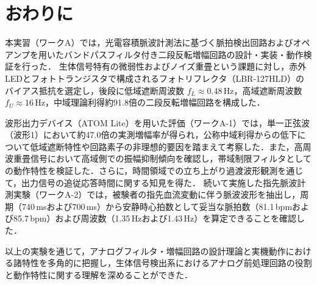 \section{おわりに}

本実習（ワークA）では，光電容積脈波計測法に基づく脈拍検出回路およびオペアンプを用いたバンドパスフィルタ付き二段反転増幅回路の設計・実装・動作検証を行った．
生体信号特有の微弱性およびノイズ重畳という課題に対し，赤外LEDとフォトトランジスタで構成されるフォトリフレクタ（LBR-127HLD）のバイアス抵抗を選定し，後段に低域遮断周波数 $f_L \approx 0.48\,\mathrm{Hz}$，高域遮断周波数 $f_U \approx 16\,\mathrm{Hz}$，中域理論利得約91.8倍の二段反転増幅回路を構成した．

波形出力デバイス（ATOM Lite）を用いた評価（ワークA-1）では，単一正弦波（波形1）において約47.0倍の実測増幅率が得られ，公称中域利得からの低下について低域遮断特性や回路素子の非理想的要因を踏まえて考察した．また，高周波重畳信号において高域側での振幅抑制傾向を確認し，帯域制限フィルタとしての動作特性を検証した．さらに，時間領域での立ち上がり過渡波形観測を通じて，出力信号の追従応答時間に関する知見を得た．
続いて実施した指先脈波計測実験（ワークA-2）では，被験者の指先血流変動に伴う脈波波形を抽出し，周期（740\,msおよび700\,ms）から安静時心拍数として妥当な脈拍数（81.1\,bpmおよび85.7\,bpm）および周波数（1.35\,Hzおよび1.43\,Hz）を算定できることを確認した．

以上の実験を通じて，アナログフィルタ・増幅回路の設計理論と実機動作における諸特性を多角的に把握し，生体信号検出系におけるアナログ前処理回路の役割と動作特性に関する理解を深めることができた．

